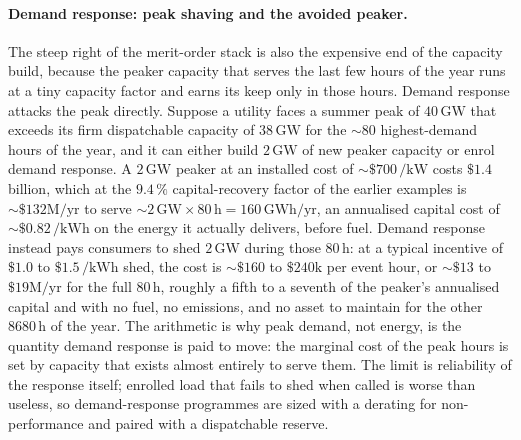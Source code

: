 \paragraph{Demand response: peak shaving and the avoided peaker.} The
steep right of the merit-order stack is also the expensive end of the
capacity build, because the peaker capacity that serves the last few hours
of the year runs at a tiny capacity factor and earns its keep only in those
hours. Demand response attacks the peak directly. Suppose a utility faces a
summer peak of $40\,\si{\giga\watt}$ that exceeds its firm dispatchable
capacity of $38\,\si{\giga\watt}$ for the $\sim 80$ highest-demand hours of
the year, and it can either build $2\,\si{\giga\watt}$ of new peaker
capacity or enrol demand response. A $2\,\si{\giga\watt}$ peaker at an
installed cost of $\sim \$700\,\si{\per\kilo\watt}$ costs $\$1.4$ billion,
which at the $9.4\,\%$ capital-recovery factor of the earlier examples is
$\sim \$132\text{M}/\text{yr}$ to serve $\sim 2\,\si{\giga\watt}\times 80\,
\si{\hour} = 160\,\si{\giga\watt\hour}/\text{yr}$, an annualised capital
cost of $\sim \$0.82\,\si{\per\kilo\watt\hour}$ on the energy it actually
delivers, before fuel. Demand response instead pays consumers to shed
$2\,\si{\giga\watt}$ during those $80\,\si{\hour}$: at a typical
incentive of $\$1.0$ to $\$1.5\,\si{\per\kilo\watt\hour}$ shed, the cost is
$\sim \$160$ to $\$240\text{k}$ per event hour, or $\sim \$13$ to $\$19
\text{M}/\text{yr}$ for the full $80\,\si{\hour}$, roughly a fifth to a
seventh of the peaker's annualised capital and with no fuel, no emissions,
and no asset to maintain for the other $8680\,\si{\hour}$ of the year. The
arithmetic is why peak demand, not energy, is the quantity demand response
is paid to move: the marginal cost of the peak hours is set by capacity
that exists almost entirely to serve them. The limit is reliability of the
response itself; enrolled load that fails to shed when called is worse than
useless, so demand-response programmes are sized with a derating for
non-performance and paired with a dispatchable reserve.

